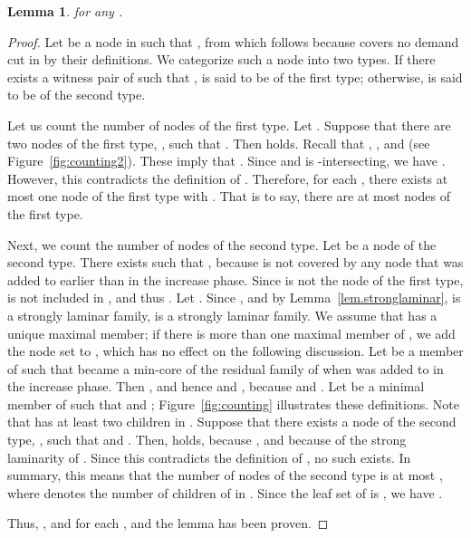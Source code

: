 \documentclass[11pt]{article}
\newtheorem{lemma}{Lemma}
\begin{document}
\begin{lemma}\label{lem.degree}
  for
 any .
\end{lemma}
  \begin{proof}
   Let  be a node in  such that 
   , from which
    follows
   because  covers no demand cut in  by
   their definitions.
   We categorize such a node  into two types.
   If there exists a witness pair
    of 
   such that ,  is said to be of the first type;
   otherwise,  is said to be of the second type.

   Let us count the number of nodes  of the first type.
   Let . Suppose that there are two nodes of the first type, ,
   such that .
   Then  holds.
   Recall that , 
   ,
   and 
   (see Figure~\ref{fig:counting2}).
   These imply that .
   Since 
   and  is -intersecting, we have
   . However, this contradicts the
   definition of .
   Therefore, for each ,
   there exists at most one node of the first type with . That is to say,
  there are at most  nodes of the first type.

  Next, we count the number of nodes of the second type.
   Let  be a node of the second type.
   There exists 
   such that  , because  is not covered by
   any node that was added to  earlier than  in the increase phase.
   Since  is not the node of the first type,
    is not included in , and thus .
   Let .
   Since
   , and by Lemma~\ref{lem.stronglaminar},
    is a strongly laminar family,
    is a strongly laminar family.
   We assume that  has a unique maximal member;
   if
   there is more than one maximal member of 
   , we add the node set  to , which has
   no effect on the following discussion.
   Let  be a member of  such that  became a
   min-core of the residual family of  when  was added to 
   in the increase phase.
   Then , and hence  and ,
   because  and .
   Let  be a minimal member of  such that  and ;
   Figure~\ref{fig:counting} illustrates these definitions.
   Note that  has at least two children in .
   Suppose that there exists a node of the second type, ,
   such that  and   
   .
   Then,
    holds, because ,
   and  because of the strong laminarity of
   .
   Since this contradicts the
   definition of ,
   no such  exists.
   In summary, this means that
   the number of nodes of the second type
   is at most ,
   where  denotes the number of children of  in
   .
   Since the leaf set of  is ,
   we have .

    Thus, ,
   and  for each , and the lemma has been proven.
  \end{proof} 
\end{document}
